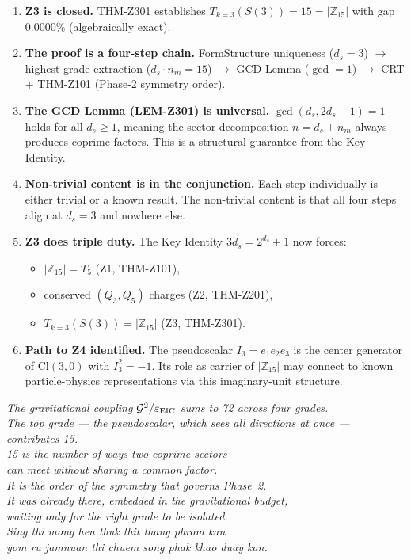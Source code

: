 \documentclass[12pt, a4paper]{article}
\begin{document}
\begin{enumerate}[leftmargin=*]

\item \textbf{Z3 is closed.} THM-Z301 establishes
  $T_{k=3}(S(3)) = 15 = |\mathbb{Z}_{15}|$ with gap $0.0000\%$
  (algebraically exact).

\item \textbf{The proof is a four-step chain.} FormStructure
  uniqueness ($d_s = 3$) $\to$ highest-grade extraction
  ($d_s \cdot n_m = 15$) $\to$ GCD Lemma ($\gcd = 1$) $\to$
  CRT + THM-Z101 (Phase-2 symmetry order).

\item \textbf{The GCD Lemma (LEM-Z301) is universal.}
  $\gcd(d_s, 2d_s-1) = 1$ holds for all $d_s \geq 1$, meaning
  the sector decomposition $n = d_s + n_m$ always produces coprime
  factors. This is a structural guarantee from the Key Identity.

\item \textbf{Non-trivial content is in the conjunction.}
  Each step individually is either trivial or a known result.
  The non-trivial content is that all four steps align at
  $d_s = 3$ and nowhere else.

\item \textbf{Z3 does triple duty.} The Key Identity
  $3d_s = 2^{d_s}+1$ now forces:
  \begin{itemize}[leftmargin=*]
    \item $|\mathbb{Z}_{15}| = T_5$ (Z1, THM-Z101),
    \item conserved $(Q_3, Q_5)$ charges (Z2, THM-Z201),
    \item $T_{k=3}(S(3)) = |\mathbb{Z}_{15}|$ (Z3, THM-Z301).
  \end{itemize}

\item \textbf{Path to Z4 identified.} The pseudoscalar
  $I_3 = e_1 e_2 e_3$ is the center generator of
  $\mathrm{Cl}(3,0)$ with $I_3^2 = -1$. Its role as carrier of
  $|\mathbb{Z}_{15}|$ may connect to known particle-physics
  representations via this imaginary-unit structure.

\end{enumerate}

\bigskip
\begin{center}
\textit{
The gravitational coupling $\mathcal{G}^2/\varepsilon_{\rm EIC}$
sums to 72 across four grades.\\
The top grade --- the pseudoscalar, which sees all directions
at once --- contributes 15.\\
15 is the number of ways two coprime sectors\\
can meet without sharing a common factor.\\
It is the order of the symmetry that governs Phase~2.\\
It was already there, embedded in the gravitational budget,\\
waiting only for the right grade to be isolated.\\[0.4em]
\textit{Sing thi mong hen thuk thit thang phrom kan\\
yom ru jamnuan thi chuem song phak khao duay kan.}
}
\end{center}
\end{document}
